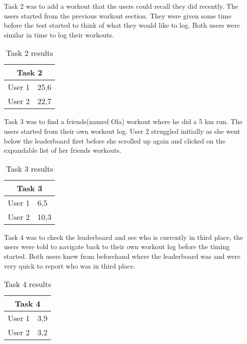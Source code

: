 Task 2 was to add a workout that the users could recall they did recently. The users started from the previous workout section. They were given some time before the test started to think of what they would like to log. Both users were similar in time to log their workouts.
\begin{table}[H]
\centering
\begin{tabular}{ |l|l| }
  \hline
  \multicolumn{2}{|c|}{Task 2} \\
  \hline
User 1 & 25,6\\ 
\hline
User 2 & 22,7\\
\hline
\end{tabular}
\caption{Task 2 results}
\end{table}

Task 3 was to find a friends(named Ola) workout where he did a 5 km run. The users started from their own workout log. User 2 struggled initially as she went below the leaderboard first before she scrolled up again and clicked on the expandable list of her friends workouts. 

\begin{table}[H]
\centering
\begin{tabular}{ |l|l| }
  \hline
  \multicolumn{2}{|c|}{Task 3} \\
  \hline
User 1 & 6,5\\ 
\hline
User 2 & 10,3\\
\hline
\end{tabular}
\caption{Task 3 results}
\end{table}

Task 4 was to check the leaderboard and see who is currently in third place, the users were told to navigate back to their own workout log before the timing started. Both users knew from beforehand where the leaderboard was and were very quick to report who was in third place.

\begin{table}[H]
\centering
\begin{tabular}{ |l|l| }
  \hline
  \multicolumn{2}{|c|}{Task 4} \\
  \hline
User 1 & 3,9\\ 
\hline
User 2 & 3,2\\
\hline
\end{tabular}
\caption{Task 4 results}
\end{table}

